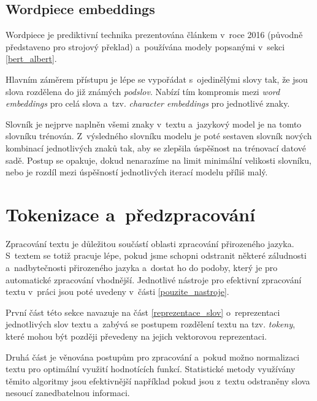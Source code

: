 \subsection{Wordpiece embeddings}
\label{wordpiece_embb}
Wordpiece je prediktivní technika prezentována článkem \cite{wordpiece} v~roce 2016 (původně představeno pro strojový překlad) a~používána modely popsanými v~sekci \ref{bert_albert}.\par
Hlavním záměrem přístupu je lépe se vypořádat s~ojedinělými slovy tak, že jsou slova rozdělena do již známých \emph{podslov}. Nabízí tím kompromis mezi \emph{word embeddings} pro celá slova a~tzv. \emph{character embeddings} pro jednotlivé znaky.\par
Slovník je nejprve naplněn všemi znaky v~textu a~jazykový model je na tomto slovníku trénován. Z~výsledného slovníku modelu je poté sestaven slovník nových kombinací jednotlivých znaků tak, aby se zlepšila úspěšnost na trénovací datové sadě. Postup se opakuje, dokud nenarazíme na limit minimální velikosti slovníku, nebo je rozdíl mezi úspěšností jednotlivých iterací modelu příliš malý.

\section{Tokenizace a~předzpracování}
\label{preprocessing}
Zpracování textu je důležitou součástí oblasti zpracování přirozeného jazyka. S~textem se totiž pracuje lépe, pokud jsme schopni odstranit některé záludnosti a~nadbytečnosti přirozeného jazyka a~dostat ho do podoby, který je pro automatické zpracování vhodnější. Jednotlivé nástroje pro efektivní zpracování textu v~práci jsou poté uvedeny v~části \ref{pouzite_nastroje}.\par
První část této sekce navazuje na část \ref{reprezentace_slov} o~reprezentaci jednotlivých slov textu a~zabývá se postupem rozdělení textu na tzv. \emph{tokeny}, které mohou být později převedeny na jejich vektorovou reprezentaci.\par
Druhá část je věnována postupům pro zpracování a~pokud možno normalizaci textu pro optimální využití hodnotících funkcí. Statistické metody využívány těmito algoritmy jsou efektivnější například pokud jsou z~textu odstraněny slova nesoucí zanedbatelnou informaci.

